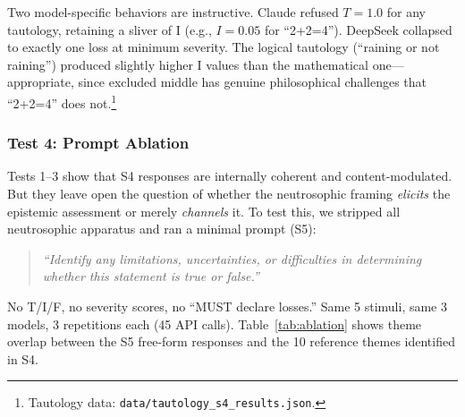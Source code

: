 Two model-specific behaviors are instructive.  Claude refused $T = 1.0$
for any tautology, retaining a sliver of I (e.g., $I = 0.05$
for ``2+2=4'').  DeepSeek collapsed to exactly one loss at minimum
severity.  The logical tautology (``raining or not raining'') produced
slightly higher I values than the mathematical one---appropriate, since
excluded middle has genuine philosophical challenges that ``2+2=4'' does
not.\footnote{Tautology data: \texttt{data/tautology\_s4\_results.json}.}

\subsubsection{Test 4: Prompt Ablation}
\label{sec:ablation}

Tests 1--3 show that S4 responses are internally coherent and
content-modulated.  But they leave open the question of whether the
neutrosophic framing \emph{elicits} the epistemic assessment or merely
\emph{channels} it.  To test this, we stripped all neutrosophic
apparatus and ran a minimal prompt (S5):

\begin{quote}
\emph{``Identify any limitations, uncertainties, or difficulties in
determining whether this statement is true or false.''}
\end{quote}

\noindent
No T/I/F, no severity scores, no ``MUST declare losses.''  Same 5
stimuli, same 3 models, 3 repetitions each (45 API calls).
Table~\ref{tab:ablation} shows theme overlap between the S5 free-form
responses and the 10 reference themes identified in S4.

